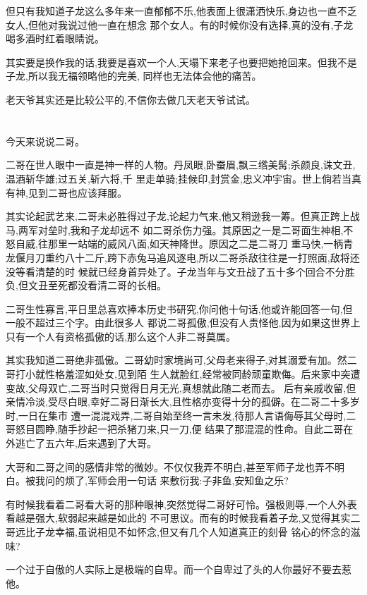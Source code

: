 ﻿\documentclass[12pt,twocolumn]{article}
\begin{document}
但只有我知道子龙这么多年来一直郁郁不乐,他表面上很潇洒快乐,身边也一直不乏女人,但他对我说过他一直在想念
那个女人。有的时候你没有选择,真的没有,子龙喝多酒时红着眼睛说。

其实要是换作我的话,我要是喜欢一个人,天塌下来老子也要把她抢回来。但我不是子龙,所以我无福领略他的完美,
同样也无法体会他的痛苦。

老天爷其实还是比较公平的,不信你去做几天老天爷试试。

\section{}

今天来说说二哥。

二哥在世人眼中一直是神一样的人物。丹凤眼,卧蚕眉,飘三绺美髯;杀颜良,诛文丑,温酒斩华雄;过五关,斩六将,千
里走单骑;挂候印,封赏金,忠义冲宇宙。世上倘若当真有神,见到二哥也应该拜服。

其实论起武艺来,二哥未必胜得过子龙,论起力气来,他又稍逊我一筹。但真正跨上战马,两军对垒时,我和子龙却远不
如二哥杀伤力强。其原因之一是二哥面生神相,不怒自威,往那里一站端的威风八面,如天神降世。原因之二是二哥刀
重马快,一柄青龙偃月刀重约八十二斤,跨下赤兔马追风逐电,所以二哥杀敌往往是一打照面,敌将还没等看清楚的时
候就已经身首异处了。子龙当年与文丑战了五十多个回合不分胜负,但文丑至死都没看清二哥的长相。

二哥生性寡言,平日里总喜欢捧本历史书研究,你问他十句话,他或许能回答一句,但一般不超过三个字。由此很多人
都说二哥孤傲,但没有人责怪他,因为如果这世界上只有一个人有资格孤傲的话,那么这个人非二哥莫属。

其实我知道二哥绝非孤傲。二哥幼时家境尚可,父母老来得子,对其溺爱有加。然二哥打小就性格羞涩如处女,见到陌
生人就脸红,经常被同龄顽童欺侮。后来家中突遭变故,父母双亡,二哥当时只觉得日月无光,真想就此随二老而去。
后有亲戚收留,但亲情冷淡,受尽白眼,幸好二哥日渐长大,且性格亦变得十分的孤僻。在二哥二十多岁时,一日在集市
遭一混混戏弄,二哥自始至终一言未发,待那人言语侮辱其父母时,二哥怒目圆睁,随手抄起一把杀猪刀来,只一刀,便
结果了那混混的性命。自此二哥在外逃亡了五六年,后来遇到了大哥。

大哥和二哥之间的感情非常的微妙。不仅仅我弄不明白,甚至军师子龙也弄不明白。被我问的烦了,军师会用一句话
来敷衍我:子非鱼,安知鱼之乐?

有时候我看着二哥看大哥的那种眼神,突然觉得二哥好可怜。强极则辱,一个人外表看越是强大,软弱起来越是如此的
不可思议。而有的时候我看着子龙,又觉得其实二哥远比子龙幸福,虽说相见不如怀念,但又有几个人知道真正的刻骨
铭心的怀念的滋味?

一个过于自傲的人实际上是极端的自卑。而一个自卑过了头的人你最好不要去惹他。
\end{document}
